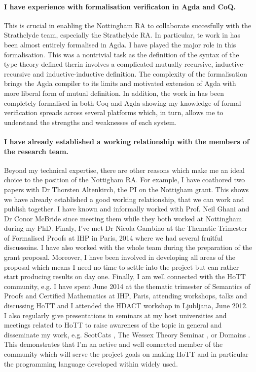 \documentclass[a4paper]{article}
\begin{document}
\paragraph{I have experience with formalisation verificaton in Agda and
  CoQ.} This is crucial in enabling the Nottingham RA to collaborate
succesfully with the Strathclyde team, especially the Strathclyde
RA. In particular, te work in
 has been almost
entirely formalised in Agda. I have played the major role in this
formalisation. This was a nontrivial task as the definition of the syntax of
the type theory defined therin involves a complicated mutually
recursive, inductive-recursive and inductive-inductive definition. The
complexity of the formalisation brings the Agda compiler to its limits
and motivated extension of Agda with more liberal form of mutual
definition. In addition, the work in  has been completely
formalised in both Coq and Agda showing my knowledge of formal
verification spreads across several platforms which, in turn, allows
me to understand the strengths and weaknesses of each system.
  

\paragraph{I have already established a working relationship with the
  members of the research team.} Beyond my technical expertise, there
are other reasons which make me an ideal choice to the position of the
Nottigham RA. For example, I have coathored two papers with Dr
Thorsten Altenkirch, the PI on the Nottigham grant. This shows we have
already established a good working relationship, that we can work and
publish together. I have known and informally worked with Prof. Neil
Ghani and Dr Conor McBride since meeting them while they both worked
at Nottingham during my PhD. Finaly, I've met Dr Nicola Gambino at the
Thematic Trimester of Formalised Proofs at IHP in Paris, 2014 where we
had several fruitful discussoins. I have also worked with the whole team during
the preparation of the grant proposal. Moreover, I have  been involved
in developing all areas of the proposal which means I need no time to
settle into the project but can rather start producing results on day one.
Finally, I am well connected with the HoTT community, e.g.
I have spent June 2014 at the thematic trimester of Semantics of
Proofs and Certified Mathematics at IHP, Paris, attending workshops,
talks and discussing HoTT and I attended the HDACT workshop in Ljubljana, June 2012. 
I also regularly give presentations in seminars at my host universities and
meetings related to HoTT to raise awareness of the topic in general
and disseminate my work, e.g. ScotCats , The
Wessex Theory Seminar , or Domains .
This demonstrates that I'm an active and well connected member of
the community which will serve the project goals on making HoTT and in
particular the programming language developed within widely used.
\end{document}
